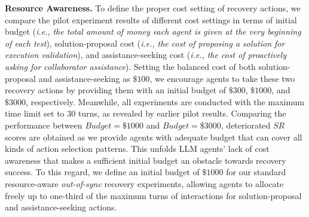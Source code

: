 \textbf{Resource Awareness.} To define the proper cost setting of recovery actions, we compare the pilot experiment results of different cost settings in terms of initial budget (\textit{i.e.,} \textit{the total amount of money each agent is given at the very beginning of each test}), solution-proposal cost (\textit{i.e.,} \textit{the cost of \textcolor{fig2_code}{proposing a solution} for execution validation}), and assistance-seeking cost (\textit{i.e.,} \textit{the cost of \textcolor{fig2_ask}{proactively asking for collaborator assistance}}). Setting the balanced cost of both solution-proposal and assistance-seeking as $\$100$, we encourage agents to take these two recovery actions by providing them with an initial budget of $\$300$, $\$1000$, and $\$3000$, respectively. Meanwhile, all experiments are conducted with the maximum time limit set to $30$ turns, as revealed by earlier pilot results. Comparing the performance between $\textit{Budget}=\$1000$ and $\textit{Budget}=\$3000$, deteriorated $SR$ scores are obtained as we provide agents with adequate budget that can cover all kinds of action selection patterns. This unfolds LLM agents' lack of cost awareness that makes a sufficient initial budget an obstacle towards recovery success. To this regard, we define an initial budget of $\$1000$ for our standard resource-aware \textit{out-of-sync} recovery experiments, allowing agents to allocate freely up to one-third of the maximum turns of interactions for solution-proposal and assistance-seeking actions.



